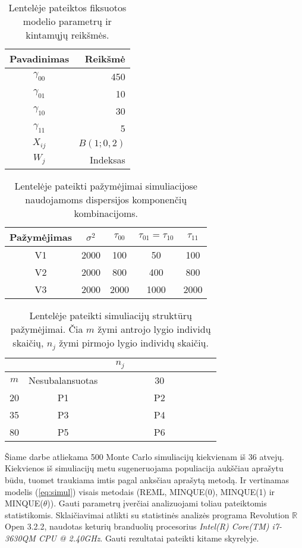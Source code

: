 \documentclass[12pt,a4paper]{article}
\newcommand{\R}{{\mathbb R}}
\begin{document}
\begin{table}[ht]
\centering
\begin{tabular}{|c|r|}
\hline
Pavadinimas & Reikšmė\\
\hline
$\gamma_{00}$& 450  \\
$\gamma_{01}$& 10  \\
$\gamma_{10}$& 30 \\
$\gamma_{11}$& 5  \\
$X_{ij}$ &  $B\left(1; 0,2\right)$ \\
$W_{j}$ &  Indeksas \\
\hline
\end{tabular}
\caption{Lentelėje pateiktos fiksuotos modelio parametrų ir kintamųjų reikšmės.}
\label{table:fixed}
\end{table}

\begin{table}[ht]
\centering
\begin{tabular}{|c|cccc|}
\hline
 Pažymėjimas & $\sigma^2$&$\tau_{00}$&$\tau_{01}=\tau_{10}$&$\tau_{11}$\\
\hline
V1&2000&100&50&100\\
V2&2000&800&400&800\\
V3&2000&2000&1000&2000\\
\hline
\end{tabular}
\caption{Lentelėje pateikti pažymėjimai simuliacijose naudojamoms dispersijos komponenčių kombinacijoms.}
\label{table:struct2}
\end{table}

\begin{table}[ht]
\centering
\begin{tabular}{|c|cc|}
\hline
 & \multicolumn{2}{c|}{$n_j$}\\
\hline
$m$& Nesubalansuotas & \ \ \ \ \ \ \ \ \ \ 30\ \ \ \ \ \ \ \ \ \ \\
\hline
20& P1&P2\\
35&P3&P4\\
80& P5&P6\\
\hline
\end{tabular}
\caption{Lentelėje pateikti simuliacijų struktūrų pažymėjimai. Čia $m$ žymi antrojo lygio individų skaičių, $n_j$ žymi pirmojo lygio individų skaičių.}
\label{table:struct1}
\end{table}



\indent Šiame darbe atliekama 500 Monte Carlo simuliacijų kiekvienam iš 36 atvejų. Kiekvienos iš simuliacijų metu sugeneruojama populiacija aukščiau aprašytu būdu, tuomet traukiama imtis pagal anksčiau aprašytą metodą. Ir vertinamas modelis (\ref{eq:simul}) visais metodais (REML, MINQUE(0), MINQUE(1) ir MINQUE($\theta$)). Gauti parametrų įverčiai analizuojami toliau pateiktomis statistikomis. Sklaičiavimai atlikti su statistinės analizės programa Revolution $\R$ Open 3.2.2, naudotas keturių branduolių procesorius \textit{Intel(R) Core(TM) i7-3630QM CPU @ 2.40GHz}. Gauti rezultatai pateikti kitame skyrelyje.
\end{document}
